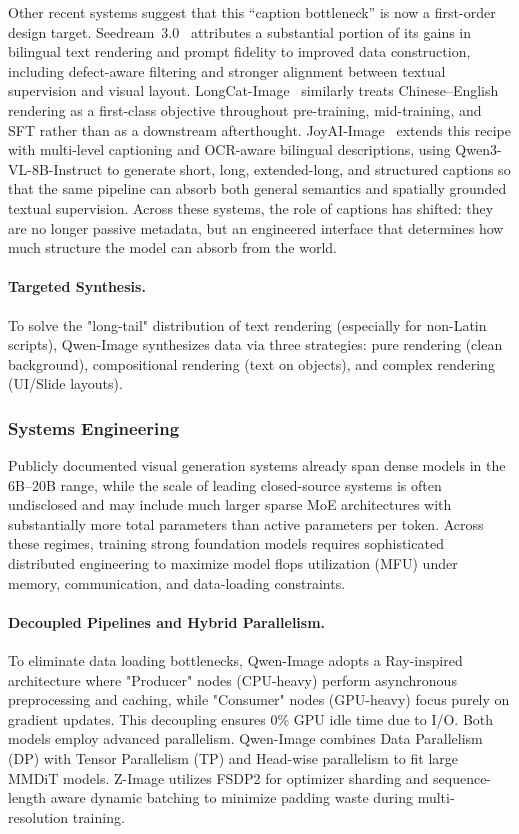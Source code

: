 Other recent systems suggest that this ``caption bottleneck'' is now a first-order design target. Seedream~3.0~\citep{gao2025seedream} attributes a substantial portion of its gains in bilingual text rendering and prompt fidelity to improved data construction, including defect-aware filtering and stronger alignment between textual supervision and visual layout. LongCat-Image~\citep{team2025longcat} similarly treats Chinese--English rendering as a first-class objective throughout pre-training, mid-training, and SFT rather than as a downstream afterthought. JoyAI-Image~\citep{jdjoyaiimage} extends this recipe with multi-level captioning and OCR-aware bilingual descriptions, using Qwen3-VL-8B-Instruct to generate short, long, extended-long, and structured captions so that the same pipeline can absorb both general semantics and spatially grounded textual supervision. Across these systems, the role of captions has shifted: they are no longer passive metadata, but an engineered interface that determines how much structure the model can absorb from the world.

\paragraph{Targeted Synthesis.}
To solve the "long-tail" distribution of text rendering (especially for non-Latin scripts), Qwen-Image synthesizes data via three strategies: pure rendering (clean background), compositional rendering (text on objects), and complex rendering (UI/Slide layouts).

\subsubsection{Systems Engineering}
Publicly documented visual generation systems already span dense models in the 6B--20B range, while the scale of leading closed-source systems is often undisclosed and may include much larger sparse MoE architectures with substantially more total parameters than active parameters per token. Across these regimes, training strong foundation models requires sophisticated distributed engineering to maximize model flops utilization (MFU) under memory, communication, and data-loading constraints.

\paragraph{Decoupled Pipelines and Hybrid Parallelism.}
To eliminate data loading bottlenecks, Qwen-Image adopts a Ray-inspired architecture where "Producer" nodes (CPU-heavy) perform asynchronous preprocessing and caching, while "Consumer" nodes (GPU-heavy) focus purely on gradient updates. This decoupling ensures 0\% GPU idle time due to I/O. Both models employ advanced parallelism. Qwen-Image combines Data Parallelism (DP) with Tensor Parallelism (TP) and Head-wise parallelism to fit large MMDiT models. Z-Image utilizes FSDP2 for optimizer sharding and sequence-length aware dynamic batching to minimize padding waste during multi-resolution training.

